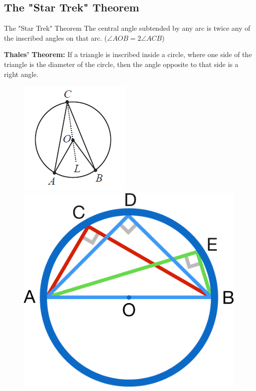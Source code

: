 \documentclass{beamer}
\begin{document}
\subsection{The "Star Trek" Theorem}
\begin{frame}{The "Star Trek" Theorem}
The central angle subtended by any arc is twice any of the inscribed angles on that arc.
($\angle AOB = 2\angle ACB$)\\ \vspace{10mm}

\textbf{Thales' Theorem:} If a triangle is inscribed inside a circle, where one side of the triangle is the diameter of the circle, then the angle opposite to that side is a right angle.

\begin{figure}[h!]
	\centering
	\includegraphics[height=0.4\textheight]{Graphics/Week_13/StarTreck.png}
	\includegraphics[height=0.4\textheight]{Graphics/Week_13/ThalesTheorem.png}
\end{figure}
\end{frame}
\end{document}
